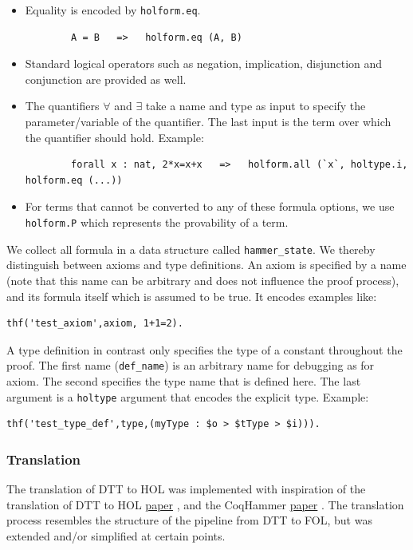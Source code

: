 \documentclass[a4paper]{article}
\begin{document}
\begin{description}
\begin{itemize}
		\item Equality is encoded by \texttt{holform.eq}.
		\begin{verbatim}
		A = B   =>   holform.eq (A, B)
		\end{verbatim}
		\item Standard logical operators such as negation, implication, disjunction and conjunction are provided as well.
		\item The quantifiers $\forall$ and $\exists$ take a name and type as input to specify the parameter/variable of the quantifier. The last input is the term over which the quantifier should hold. Example:
		\begin{verbatim}
		forall x : nat, 2*x=x+x   =>   holform.all (`x`, holtype.i, holform.eq (...))
		\end{verbatim}
		\item For terms that cannot be converted to any of these formula options, we  use \texttt{holform.P} which represents the provability of a term.
	\end{itemize}
\end{description}

We collect all formula in a data structure called \texttt{hammer\_state}. We thereby distinguish between axioms and type definitions. An axiom is specified by a name (note that this name can be arbitrary and does not influence the proof process), and its formula itself which is assumed to be true. It encodes examples like:
\begin{verbatim}
thf('test_axiom',axiom, 1+1=2).
\end{verbatim}
A type definition in contrast only specifies the type of a constant throughout the proof. The first name (\texttt{def\_name}) is an arbitrary name for debugging as for axiom. The second specifies the type name that is defined here. The last argument is a \texttt{holtype} argument that encodes the explicit type. Example:

\begin{verbatim}
thf('test_type_def',type,(myType : $o > $tType > $i))).
\end{verbatim}

\subsubsection{Translation}
The translation of DTT to HOL was implemented with inspiration of the  translation of DTT to HOL \href{https://link.springer.com/chapter/10.1007/BFb0037108}{paper} \cite{DTT2HOL}, and the CoqHammer \href{https://link.springer.com/article/10.1007/s10817-018-9458-4}{paper} \cite{CoqHammer}. The translation process resembles the structure of the pipeline from DTT to FOL, but was extended and/or simplified at certain points. \\
\end{document}
